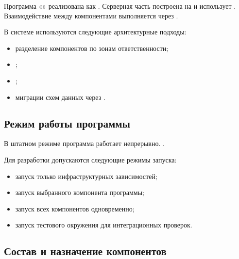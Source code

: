 \documentclass[12pt,a4paper]{extarticle}
\begin{document}
\begin{hseExample}
Программа «\projectname» реализована как . Серверная часть построена на  и использует . Взаимодействие между компонентами выполняется через .

В системе используются следующие архитектурные подходы:

\begin{itemize}[leftmargin=1.25cm]
    \item разделение компонентов по зонам ответственности;
    \item {};
    \item {};
    \item миграции схем данных через .
\end{itemize}
\end{hseExample}

\subsection{Режим работы программы}

\begin{hseExample}
В штатном режиме программа работает непрерывно. .

Для разработки допускаются следующие режимы запуска:

\begin{itemize}[leftmargin=1.25cm]
    \item запуск только инфраструктурных зависимостей;
    \item запуск выбранного компонента программы;
    \item запуск всех компонентов одновременно;
    \item запуск тестового окружения для интеграционных проверок.
\end{itemize}
\end{hseExample}

\subsection{Состав и назначение компонентов}
\end{document}
